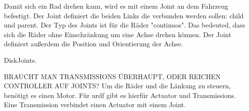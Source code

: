Damit sich ein Rad drehen kann, wird es mit einem Joint an dem Fahrzeug befestigt.
Der Joint definiert die beiden Links die verbunden werden sollen: child und parent.
Der Typ des Joints ist für die Räder "continuos". Das bedeuted, dass sich die Räder ohne Einschränkung um eine Achse drehen können.
Der Joint definiert außerdem die Position und Orientierung der Achse.

DiskJoints.

BRAUCHT MAN TRANSMISSIONS ÜBERHAUPT, ODER REICHEN CONTROLLER AUF JOINTS?
Um die Räder und die Länkung zu steuern, benötigt es einen Motor. 
Für urdf gibt es hierfür Actuator und Transmissions.
Eine Transmission verbindet einen Actuator mit einem Joint. 